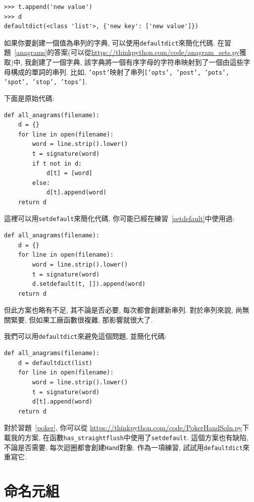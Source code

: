 \documentclass[10pt]{book}
\begin{document}
\begin{verbatim}
>>> t.append('new value')
>>> d
defaultdict(<class 'list'>, {'new key': ['new value']})
\end{verbatim}

如果你要創建一個值為串列的字典, 可以使用{\tt defaultdict}來簡化代碼. 
在習題~\ref{anagrams}的答案(可以從\url{https://thinkpython.com/code/anagram_sets.py}獲取)中, 
我創建了一個字典, 該字典將一個有序字母的字符串映射到了一個由這些字母構成的單詞的串列. 
比如, {\tt 'opst'}映射了串列{\tt ['opts', 'post', 'pots', 'spot', 'stop', 'tops']}.

下面是原始代碼:

\begin{verbatim}
def all_anagrams(filename):
    d = {}
    for line in open(filename):
        word = line.strip().lower()
        t = signature(word)
        if t not in d:
            d[t] = [word]
        else:
            d[t].append(word)
    return d
\end{verbatim}

這裡可以用{\tt setdefault}來簡化代碼, 你可能已經在練習~\ref{setdefault}中使用過:

\begin{verbatim}
def all_anagrams(filename):
    d = {}
    for line in open(filename):
        word = line.strip().lower()
        t = signature(word)
        d.setdefault(t, []).append(word)
    return d
\end{verbatim}

但此方案也略有不足, 其不論是否必要, 每次都會創建新串列. 
對於串列來說, 尚無關緊要, 但如果工廠函數很複雜, 
那影響就很大了. 

我們可以用{\tt defaultdict}來避免這個問題, 並簡化代碼:

\begin{verbatim}
def all_anagrams(filename):
    d = defaultdict(list)
    for line in open(filename):
        word = line.strip().lower()
        t = signature(word)
        d[t].append(word)
    return d
\end{verbatim}

對於習題~\ref{poker}, 你可以從
\url{https://thinkpython.com/code/PokerHandSoln.py}下載我的方案, 
在函數\verb"has_straightflush"中使用了{\tt setdefault}. 
這個方案也有缺陷, 不論是否需要, 每次迴圈都會創建{\tt Hand}對象. 
作為一項練習, 試試用{\tt defaultdict}來重寫它. 


\section{命名元組}
\label{Named tuples}
\end{document}
